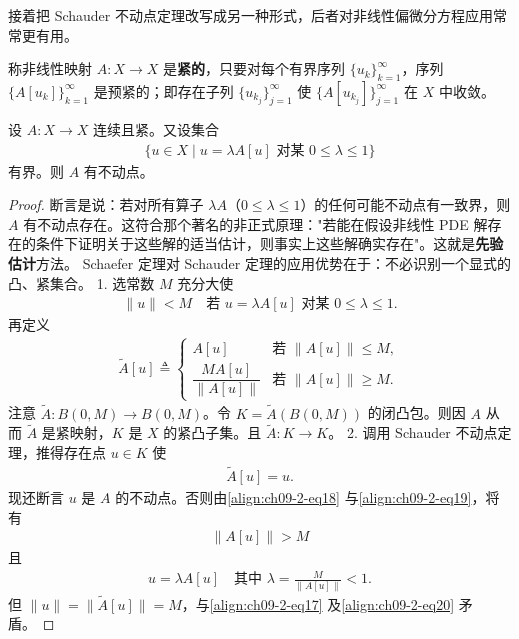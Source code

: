 \documentclass[../../main.tex]{subfiles}
\begin{document}
接着把 Schauder 不动点定理改写成另一种形式，后者对非线性偏微分方程应用常常更有用。

\begin{definition}\label{definition:ch09-2-紧映射}
称非线性映射 $A:X\to X$ 是\textbf{紧的}，只要对每个有界序列 $\{u_k\}_{k=1}^\infty$，序列 $\{A[u_k]\}_{k=1}^\infty$ 是预紧的；即存在子列 $\{u_{k_j}\}_{j=1}^\infty$ 使 $\{A[u_{k_j}]\}_{j=1}^\infty$ 在 $X$ 中收敛。
\end{definition}

\begin{theorem}\label{theorem:ch09-2-4-Schaefer}
设 $A:X\to X$ 连续且紧。又设集合
\begin{align*}
\{u\in X\mid u=\lambda A[u]\text{ 对某 }0\leqslant\lambda\leqslant 1\}
\end{align*}
有界。则 $A$ 有不动点。
\begin{proof}
断言是说：若对所有算子 $\lambda A$（$0\leqslant\lambda\leqslant 1$）的任何可能不动点有一致界，则 $A$ 有不动点存在。这符合那个著名的非正式原理："若能在假设非线性 PDE 解存在的条件下证明关于这些解的适当估计，则事实上这些解确实存在"。这就是\textbf{先验估计}方法。
Schaefer 定理对 Schauder 定理的应用优势在于：不必识别一个显式的凸、紧集合。
1. 选常数 $M$ 充分大使
\begin{align}
\|u\|<M\quad\text{若 }u=\lambda A[u]\text{ 对某 }0\leqslant\lambda\leqslant 1.\label{align:ch09-2-eq17}
\end{align}
再定义
\begin{align}
\widetilde{A}[u]\triangleq\begin{cases}A[u]&\text{若 }\|A[u]\|\leqslant M,\\ \dfrac{MA[u]}{\|A[u]\|}&\text{若 }\|A[u]\|\geqslant M.\end{cases}\label{align:ch09-2-eq18}
\end{align}
注意 $\widetilde{A}:B(0,M)\to B(0,M)$。令 $K=\widetilde{A}(B(0,M))$ 的闭凸包。则因 $A$ 从而 $\widetilde{A}$ 是紧映射，$K$ 是 $X$ 的紧凸子集。且 $\widetilde{A}:K\to K$。
2. 调用 Schauder 不动点定理，推得存在点 $u\in K$ 使
\begin{align}
\widetilde{A}[u]=u.\label{align:ch09-2-eq19}
\end{align}
现还断言 $u$ 是 $A$ 的不动点。否则由\eqref{align:ch09-2-eq18} 与\eqref{align:ch09-2-eq19}，将有
\begin{align*}
\|A[u]\|>M
\end{align*}
且
\begin{align}
u=\lambda A[u]\quad\text{其中 }\lambda=\frac{M}{\|A[u]\|}<1.\label{align:ch09-2-eq20}
\end{align}
但 $\|u\|=\|\widetilde{A}[u]\|=M$，与\eqref{align:ch09-2-eq17} 及\eqref{align:ch09-2-eq20} 矛盾。
\end{proof}
\end{theorem}
\end{document}
